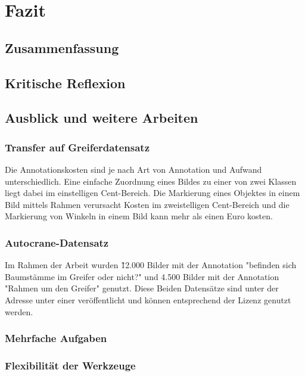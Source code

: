 \chapter{Fazit}
\label{chap:Fazit}

	\section{Zusammenfassung}
	\label{sec:Zusammenfassung}
			
	\section{Kritische Reflexion}
	\label{sec:KritischeReflexion}
				
	\section{Ausblick und weitere Arbeiten}
	\label{sec:AusblickWeitereArbeiten}


	\subsection{Transfer auf Greiferdatensatz}
	\label{subsec:TransferGreiferDatensatz}
 	Die Annotationskosten sind je nach Art von Annotation und Aufwand unterschiedlich. Eine einfache Zuordnung eines Bildes zu einer von zwei Klassen liegt dabei im einstelligen Cent-Bereich. Die Markierung eines Objektes in einem Bild mittels Rahmen verursacht Kosten im zweistelligen Cent-Bereich und die Markierung von Winkeln in einem Bild kann mehr als einen Euro kosten. 		

	\subsection{Autocrane-Datensatz}
	\label{subsec:AutocraneDatensatz}	
	Im Rahmen der Arbeit wurden \~ 12.000 Bilder mit der Annotation "befinden sich Baumstämme im Greifer oder nicht?" und 4.500 Bilder mit der Annotation "Rahmen um den Greifer" genutzt. Diese Beiden Datensätze sind unter der Adresse  unter einer  veröffentlicht und können entsprechend der Lizenz genutzt werden.  


	\subsection{Mehrfache Aufgaben}
	\label{subsec:MehrfacheAufgaben}
	

	\subsection{Flexibilität der Werkzeuge}
	\label{subsec:FlexibilitätDerWerkzeuge}
